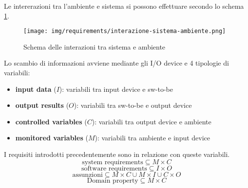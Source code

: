 Le intererazioni tra l'ambiente e sistema si possono effettuare secondo lo 
schema \ref{fig:int-sistema-ambiente}.
\begin{figure}[!ht]
      \centering
      \texttt{[image: img/requirements/interazione-sistema-ambiente.png]}
      \caption{Schema delle interazioni tra sistema e ambiente}
      \label{fig:int-sistema-ambiente}
\end{figure}
Lo scambio di informazioni avviene mediante gli I/O device e 4 tipologie di variabili:
\begin{itemize}
	\item \textbf{input data} ($I$): variabili tra input device e sw-to-be
	\item \textbf{output results} ($O$): variabili tra sw-to-be e output device 
	\item \textbf{controlled variables} ($C$): variabili tra output device e ambiente
	\item \textbf{monitored variables} ($M$): variabili tra ambiente e input device
\end{itemize}
I requisiti introdotti precedentemente sono in relazione con queste variabili. 
$$\text{system requirements} \subseteq M\times C$$
$$\text{software requirements} \subseteq I\times O$$
$$\text{assunzioni} \subseteq M\times C\cup M\times I\cup C\times O$$
$$\text{Domain property}\subseteq M\times C$$
